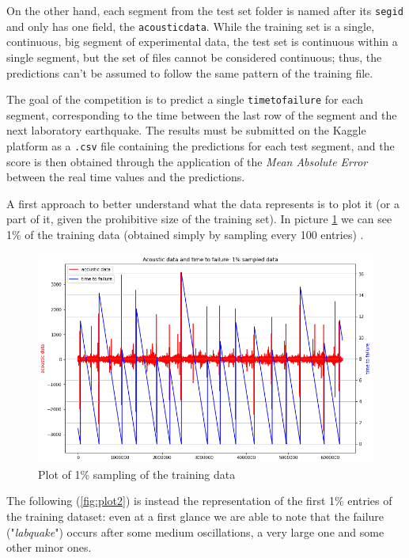 On the other hand, each segment from the test set folder is named after its \texttt{seg\textunderscore id} and only has one field, the \texttt{acoustic\textunderscore data}.
While the training set is a single, continuous, big segment of experimental data, the test set is continuous within a single segment, but the set of files cannot be considered continuous; thus, the predictions can't be assumed to follow the same pattern of the training file.

The goal of the competition is to predict a single \texttt{time\textunderscore to\textunderscore failure} for each segment, corresponding to the time between the last row of the segment and the next laboratory earthquake. The results must be submitted on the Kaggle platform as a \texttt{.csv} file containing the predictions for each test segment, and the score is then obtained through the application of the \textit{Mean Absolute Error} between the real time values and the predictions.

\bigbreak

A first approach to better understand what the data represents is to plot it (or a part of it, given the prohibitive size of the training set). In picture \ref{fig:plot1} we can see 1\% of the training data (obtained simply by sampling every 100 entries) \cite{kernelpreda}.

\begin{figure} [h]
	\centering
	\includegraphics[width=0.7\linewidth]{pictures/plot1.png}
	\caption{Plot of 1\% sampling of the training data}
	\label{fig:plot1}
\end{figure}

The following (\ref{fig:plot2}) is instead the representation of the first 1\% entries of the training dataset: even at a first glance we are able to note that the failure ("\textit{labquake}") occurs after some medium oscillations, a very large one and some other minor ones. 

